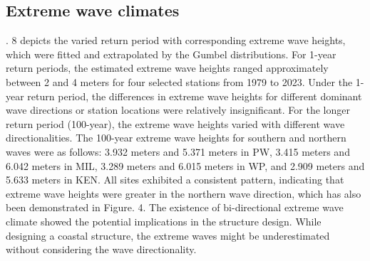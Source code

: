 \subsection{Extreme wave climates}
\label{c3_Extreme wave climates}

. 8 depicts the varied return period with corresponding extreme wave heights, which were fitted and extrapolated by the Gumbel distributions. For 1-year return periods, the estimated extreme wave heights ranged approximately between 2 and 4 meters for four selected stations from 1979 to 2023. Under the 1-year return period, the differences in extreme wave heights for different dominant wave directions or station locations were relatively insignificant. For the longer return period (100-year), the extreme wave heights varied with different wave directionalities. The 100-year extreme wave heights for southern and northern waves were as follows: 3.932 meters and 5.371 meters in PW, 3.415 meters and 6.042 meters in MIL, 3.289 meters and 6.015 meters in WP, and 2.909 meters and 5.633 meters in KEN. All sites exhibited a consistent pattern, indicating that extreme wave heights were greater in the northern wave direction, which has also been demonstrated in Figure. 4. The existence of bi-directional extreme wave climate showed the potential implications in the structure design. While designing a coastal structure, the extreme waves might be underestimated without considering the wave directionality.

